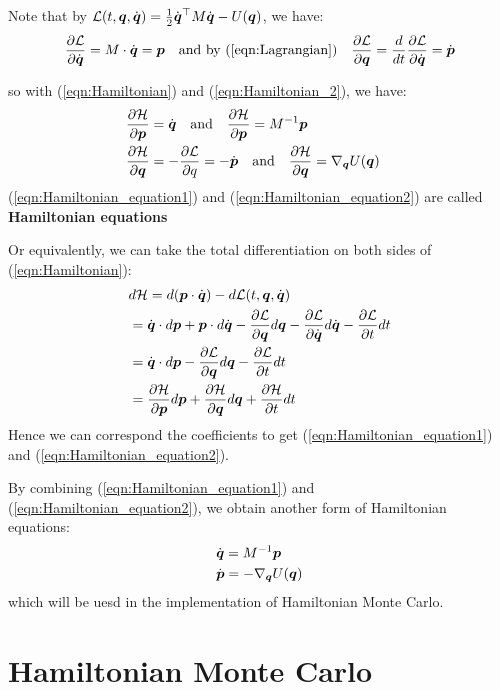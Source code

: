 \documentclass[hidelinks]{article}[12pt]
\begin{document}
Note that by ${\cal L}(t, \boldsymbol{q}, \dot{\boldsymbol{q}}) = \frac12 \dot{\boldsymbol{q}}^\top M \dot{\boldsymbol{q}} - U(\boldsymbol{q})$, we have:
\[\frac{\partial{{\cal L}}}{\partial{\dot{\boldsymbol{q}}}} = M\cdot\dot{\boldsymbol{q}} = \boldsymbol{p} \quad \text{and by (\ref{eqn:Lagrangian})} \quad \frac{\partial{{\cal L}}}{\partial{\boldsymbol{q}}} = \frac{d}{dt}\frac{\partial{{\cal L}}}{\partial{\dot{\boldsymbol{q}}}} = \dot{\boldsymbol{p}}\]

so with (\ref{eqn:Hamiltonian}) and (\ref{eqn:Hamiltonian_2}), we have:
\begin{align}
& \frac{\partial{{\cal H}}}{\partial{\boldsymbol{p}}} = \dot{\boldsymbol{q}} \quad \text{and} \quad \frac{\partial{{\cal H}}}{\partial{\boldsymbol{p}}} = M^{-1} \boldsymbol{p} \quad \label{eqn:Hamiltonian_equation1}\\
& \frac{\partial{{\cal H}}}{\partial{\boldsymbol{q}}} = -\frac{\partial{{\cal L}}}{\partial{q}} = - \dot{\boldsymbol{p}} \quad \text{and} \quad \frac{\partial{{\cal H}}}{\partial{\boldsymbol{q}}} = \nabla_{\boldsymbol{q}} U(\boldsymbol{q})\quad \label{eqn:Hamiltonian_equation2}
\end{align}
(\ref{eqn:Hamiltonian_equation1}) and (\ref{eqn:Hamiltonian_equation2}) are called \textbf{Hamiltonian equations}

Or equivalently, we can take the total differentiation on both sides of (\ref{eqn:Hamiltonian}):
\begin{align*}
& d{\cal H} = d(\boldsymbol{p}\cdot \dot{\boldsymbol{q}}) - d{\cal L}(t, \boldsymbol{q}, \dot{\boldsymbol{q}})\\
& = \dot{\boldsymbol{q}}\cdot d\boldsymbol{p} + \boldsymbol{p} \cdot d\dot{\boldsymbol{q}} - \frac{\partial{{\cal L}}}{\partial{\boldsymbol{q}}}d\boldsymbol{q} - \frac{\partial{{\cal L}}}{\partial{\dot{\boldsymbol{q}}}}d\dot{\boldsymbol{q}} - \frac{\partial{{\cal L}}}{\partial{t}}dt\\
& = \dot{\boldsymbol{q}}\cdot d\boldsymbol{p} - \frac{\partial{{\cal L}}}{\partial{\boldsymbol{q}}}d\boldsymbol{q} - \frac{\partial{{\cal L}}}{\partial{t}}dt\\
& = \frac{\partial{{\cal H}}}{\partial{\boldsymbol{p}}}d\boldsymbol{p} + \frac{\partial{{\cal H}}}{\partial{\boldsymbol{q}}} d\boldsymbol{q} + \frac{\partial{{\cal H}}}{\partial{t}}dt
\end{align*}
Hence we can correspond the coefficients to get (\ref{eqn:Hamiltonian_equation1}) and (\ref{eqn:Hamiltonian_equation2}).

By combining (\ref{eqn:Hamiltonian_equation1}) and (\ref{eqn:Hamiltonian_equation2}), we obtain another form of Hamiltonian equations:
\begin{align}
& \dot{\boldsymbol{q}} = M^{-1} \boldsymbol{p} \label{eqn:Hamiltonian_equation3}\\
& \dot{\boldsymbol{p}} = - \nabla_{\boldsymbol{q}} U(\boldsymbol{q}) \label{eqn:Hamiltonian_equation4}
\end{align}
which will be uesd in the implementation of Hamiltonian Monte Carlo.

\section{Hamiltonian Monte Carlo}
\end{document}
